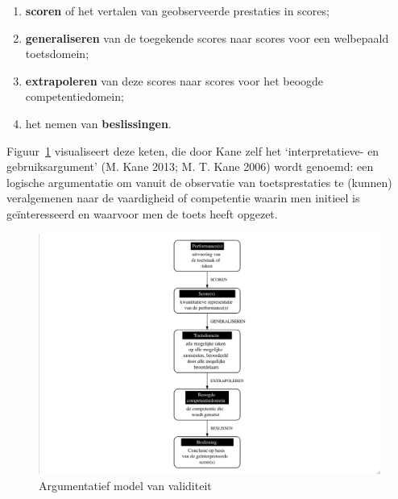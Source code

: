 \documentclass[
  letterpaper,
]{report}
\providecommand{\tightlist}{%
  \setlength{\itemsep}{0pt}\setlength{\parskip}{0pt}}
\begin{document}
\begin{enumerate}
\def\labelenumi{\arabic{enumi}.}
\tightlist
\item
  \textbf{scoren} of het vertalen van geobserveerde prestaties in
  scores;
\item
  \textbf{generaliseren} van de toegekende scores naar scores voor een
  welbepaald toetsdomein;
\item
  \textbf{extrapoleren} van deze scores naar scores voor het beoogde
  competentiedomein;
\item
  het nemen van \textbf{beslissingen}.
\end{enumerate}

Figuur~\ref{fig-figuur1} visualiseert deze keten, die door Kane zelf het
`interpretatieve- en gebruiksargument' (M. Kane 2013; M. T. Kane 2006)
wordt genoemd: een logische argumentatie om vanuit de observatie van
toetsprestaties te (kunnen) veralgemenen naar de vaardigheid of
competentie waarin men initieel is geïnteresseerd en waarvoor men de
toets heeft opgezet.

\begin{figure}

{\centering \includegraphics{./FIG1.jpeg}

}

\caption{\label{fig-figuur1}Argumentatief model van validiteit}

\end{figure}
\end{document}

